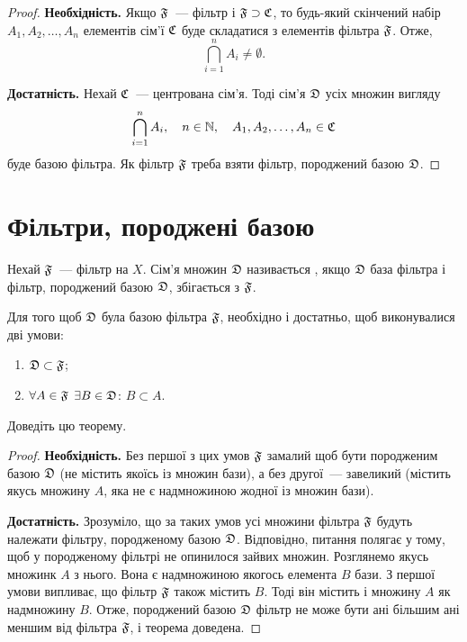 \begin{proof}
    \textbf{Необхідність.} Якщо $\frak F$~--- фільтр і $\frak F \supset \frak C$, то будь-який скінчений набір $A_1, A_2, \dots, A_n$ елементів сім'ї $\frak C$ буде складатися з елементів фільтра $\frak F$. Отже, 
    \begin{equation*}
        \bigcap_{i = 1}^n A_i \ne \emptyset.
    \end{equation*}

    \textbf{Достатність.} Нехай $\frak C$~--- центрована сім'я. Тоді сім'я $\frak D$ усіх множин вигляду
    \begin{equation*}
        \bigcap_{i = 1}^n A_i, \quad n \in \NN, \quad A_1, A_2, \dots, A_n \in \frak C
    \end{equation*}
    буде базою фільтра. Як фільтр $\frak F$ треба взяти фільтр, породжений базою $\frak D$.
\end{proof}

\section{Фільтри, породжені базою}

\begin{definition}
    Нехай $\frak F$~--- фільтр на $X$. Сім'я множин $\frak D$ називається , якщо $\frak D$ база фільтра і фільтр, породжений базою $\frak D$, збігається з $\frak F$.
\end{definition}

\begin{theorem}
    \label{th:filterbase-criterion}
    Для того щоб $\frak D$ була базою фільтра $\frak F$, необхідно і достатньо, щоб виконувалися дві умови:
    \begin{enumerate}
        \item $\frak D \subset \frak F$;
        \item $\forall A \in \frak F$ $\exists B \in \frak D$: $B \subset A$.
    \end{enumerate}
\end{theorem}

\begin{exercise}
    Доведіть цю теорему.
\end{exercise}
\begin{proof}
    \textbf{Необхідність.} Без першої з цих умов $\frak F$ замалий щоб бути породженим базою $\frak D$ (не містить якоїсь із множин бази), а без другої~--- завеликий (містить якусь множину $A$, яка не є надмножиною жодної із множин бази). 
    
    \textbf{Достатність.} Зрозуміло, що за таких умов усі множини фільтра $\frak F$ будуть належати фільтру, породженому базою $\frak D$. Відповідно, питання полягає у тому, щоб у породженому фільтрі не опинилося зайвих множин. Розглянемо якусь множинк $A$ з нього. Вона є надмножиною якогось елемента $B$ бази. З першої умови випливає, що фільтр $\frak F$ також містить $B$. Тоді він містить і множину $A$ як надмножину $B$. Отже, породжений базою $\frak D$ фільтр не може бути ані більшим ані меншим від фільтра $\frak F$, і теорема доведена.
\end{proof}

